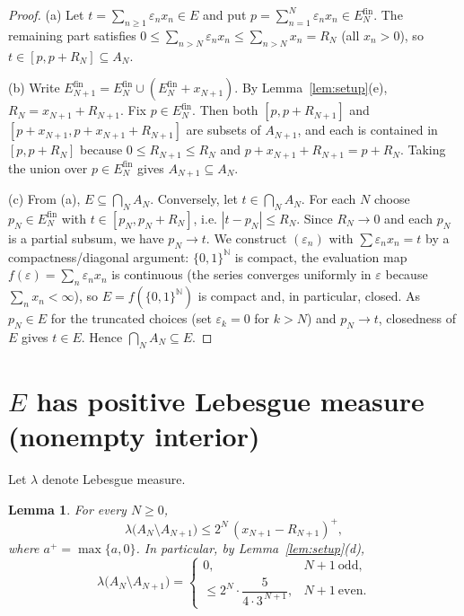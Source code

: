 \documentclass{amsart}
\newtheorem{lemma}{Lemma}
\theoremstyle{definition}
\begin{document}
\begin{proof}
(a) Let $t=\sum_{n\ge1}\varepsilon_nx_n\in E$ and put $p=\sum_{n=1}^N\varepsilon_nx_n\in
E_N^{\mathrm{fin}}$. The remaining part satisfies
$0\le\sum_{n>N}\varepsilon_nx_n\le\sum_{n>N}x_n=R_N$ (all $x_n>0$), so $t\in[p,p+R_N]\subseteq A_N$.

(b) Write $E_{N+1}^{\mathrm{fin}}=E_N^{\mathrm{fin}}\cup(E_N^{\mathrm{fin}}+x_{N+1})$. By
Lemma~\ref{lem:setup}(e), $R_N=x_{N+1}+R_{N+1}$. Fix $p\in E_N^{\mathrm{fin}}$. Then both
$[p,p+R_{N+1}]$ and $[p+x_{N+1},p+x_{N+1}+R_{N+1}]$ are subsets of $A_{N+1}$, and each is contained
in $[p,p+R_N]$ because $0\le R_{N+1}\le R_N$ and $p+x_{N+1}+R_{N+1}=p+R_N$. Taking the union over
$p\in E_N^{\mathrm{fin}}$ gives $A_{N+1}\subseteq A_N$.

(c) From (a), $E\subseteq\bigcap_N A_N$. Conversely, let $t\in\bigcap_N A_N$. For each $N$ choose
$p_N\in E_N^{\mathrm{fin}}$ with $t\in[p_N,p_N+R_N]$, i.e. $|t-p_N|\le R_N$. Since $R_N\to0$ and each
$p_N$ is a partial subsum, we have $p_N\to t$. We construct $(\varepsilon_n)$ with
$\sum\varepsilon_nx_n=t$ by a compactness/diagonal argument: $\{0,1\}^{\mathbb N}$ is compact, the
evaluation map $f(\varepsilon)=\sum_n\varepsilon_nx_n$ is continuous (the series converges uniformly
in $\varepsilon$ because $\sum_n x_n<\infty$), so $E=f(\{0,1\}^{\mathbb N})$ is compact and, in
particular, closed. As $p_N\in E$ for the truncated choices (set $\varepsilon_k=0$ for $k>N$) and
$p_N\to t$, closedness of $E$ gives $t\in E$. Hence $\bigcap_N A_N\subseteq E$.
\end{proof}

\section{$E$ has positive Lebesgue measure (nonempty interior)}\label{sec:measure}

Let $\lambda$ denote Lebesgue measure.

\begin{lemma}\label{lem:remove}
For every $N\ge0$,
\[
  \lambda\bigl(A_N\setminus A_{N+1}\bigr)\le 2^{N}\,(x_{N+1}-R_{N+1})^{+},
\]
where $a^+=\max\{a,0\}$. In particular, by Lemma~\ref{lem:setup}(d),
\[
  \lambda\bigl(A_N\setminus A_{N+1}\bigr)=
  \begin{cases}
    0, & N+1\ \text{odd},\\[2pt]
    \le 2^{N}\cdot\dfrac{5}{4\cdot3^{\,N+1}}, & N+1\ \text{even}.
  \end{cases}
\]
\end{lemma}
\end{document}
